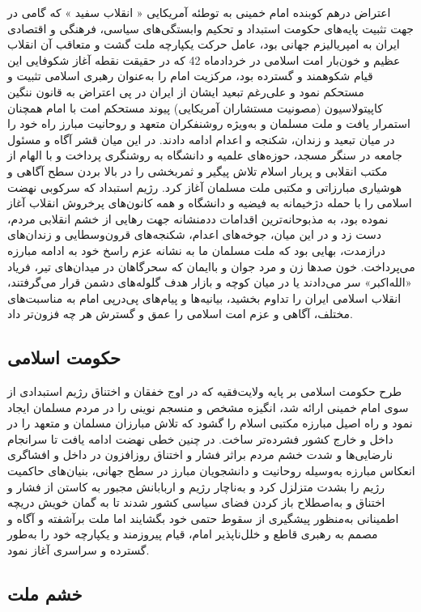 \documentclass[12pt]{article}
\begin{document}
‌اعتراض درهم کوبنده امام خمینی به توطئه آمریکایی « انقلاب سفید » که گامی در جهت تثبیت پایه‌های حکومت استبداد و تحکیم ‌وابستگی‌های سیاسی‌، فرهنگی و اقتصادی ایران به امپریالیزم جهانی بود، عامل حرکت یکپارچه ملت گشت و متعاقب آن انقلاب عظیم و خون‌بار امت اسلامی در خردادماه 42 که در حقیقت نقطه آغاز شکوفایی این قیام شکوهمند و گسترده بود، مرکزیت امام را به‌عنوان رهبری اسلامی تثبیت و مستحکم نمود و علی‌رغم تبعید ایشان از ایران در پی اعتراض به قانون ننگین کاپیتولاسیون‌ (مصونیت مستشاران آمریکایی‌) پیوند مستحکم امت با امام همچنان استمرار یافت و ملت مسلمان و به‌ویژه روشنفکران متعهد و روحانیت مبارز راه خود را در میان تبعید و زندان‌، شکنجه و اعدام ادامه دادند. در این میان قشر آگاه و مسئول جامعه در سنگر مسجد، حوزه‌های علمیه و دانشگاه به روشنگری پرداخت و با الهام از مکتب انقلابی و پربار اسلام تلاش پیگیر و ثمربخشی را در بالا بردن سطح آگاهی و هوشیاری مبارزاتی و مکتبی ملت مسلمان آغاز کرد. رژیم استبداد که سرکوبی نهضت اسلامی را با حمله دژخیمانه به فیضیه و دانشگاه و همه کانون‌های پرخروش انقلاب آغاز نموده بود، به مذبوحانه‌ترین اقدامات ددمنشانه جهت رهایی از خشم انقلابی مردم‌، دست زد و در این میان‌، جوخه‌های اعدام‌، شکنجه‌های قرون‌وسطایی و زندان‌های درازمدت، بهایی بود که ملت مسلمان ما به نشانه عزم راسخ خود به ادامه مبارزه می‌پرداخت‌. خون صدها زن و مرد جوان و باایمان که سحرگاهان در میدان‌های تیر، فریاد «الله‌اکبر» سر می‌دادند یا در میان کوچه و بازار هدف گلوله‌های دشمن قرار می‌گرفتند، انقلاب اسلامی ‌ایران را تداوم بخشید، بیانیه‌ها و پیام‌های پی‌درپی امام به مناسبت‌های مختلف‌، آگاهی و عزم امت اسلامی را عمق و گسترش هر چه فزون‌تر داد.

\subsection*{حکومت اسلامی}
‌طرح حکومت اسلامی بر پایه ولایت‌فقیه که در اوج خفقان و اختناق رژیم استبدادی از سوی امام خمینی ارائه شد، انگیزه مشخص و منسجم نوینی را در مردم مسلمان ایجاد نمود و راه اصیل مبارزه مکتبی اسلام را گشود که تلاش مبارزان مسلمان و متعهد را در داخل و خارج کشور فشرده‌تر ساخت‌. در چنین خطی نهضت ادامه یافت تا سرانجام نارضایی‌ها و شدت خشم مردم براثر فشار و اختناق روزافزون در داخل و افشاگری انعکاس مبارزه به‌وسیله روحانیت و دانشجویان مبارز در سطح جهانی، بنیان‌های حاکمیت رژیم را بشدت متزلزل کرد و به‌ناچار رژیم و اربابانش مجبور به کاستن از فشار و اختناق و به‌اصطلاح‌ باز کردن فضای سیاسی کشور شدند تا به گمان خویش دریچه اطمینانی به‌منظور پیشگیری از سقوط حتمی خود بگشایند اما ملت برآشفته و آگاه و مصمم به رهبری قاطع و خلل‌ناپذیر امام‌، قیام پیروزمند و یکپارچه خود را به‌طور گسترده و سراسری آغاز نمود.

\subsection*{خشم ملت}
\end{document}
